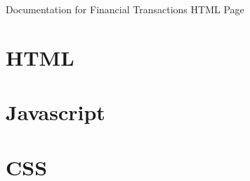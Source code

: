 \documentclass[letterpaper]{article}
\begin{document}
\vspace*{\fill}
\begin{center}
    \Large
    Documentation for Financial Transactions HTML Page
\end{center}
\vspace*{\fill}

\newpage
{}
\tableofcontents

\newpage
{}

\section{HTML}

\newpage

\section{Javascript}

\newpage

\section{CSS}
\end{document}
